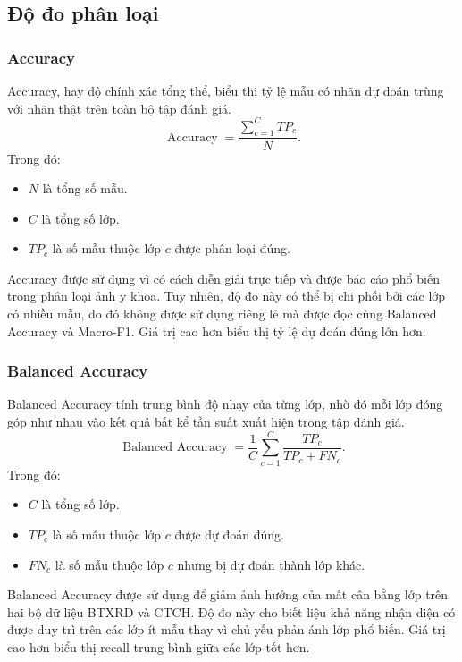 \subsection{Độ đo phân loại}
\subsubsection{Accuracy}
Accuracy, hay độ chính xác tổng thể, biểu thị tỷ lệ mẫu có nhãn dự đoán trùng với nhãn thật trên toàn bộ tập đánh giá.
\begin{equation}\operatorname{Accuracy}=\frac{\sum_{c=1}^{C} TP_c}{N}.\label{eq:ch4_accuracy}\end{equation}
Trong đó:
\begin{itemize}
    \item $N$ là tổng số mẫu.
    \item $C$ là tổng số lớp.
    \item $TP_c$ là số mẫu thuộc lớp $c$ được phân loại đúng.
\end{itemize}
Accuracy được sử dụng vì có cách diễn giải trực tiếp và được báo cáo phổ biến trong phân loại ảnh y khoa. Tuy nhiên, độ đo này có thể bị chi phối bởi các lớp có nhiều mẫu, do đó không được sử dụng riêng lẻ mà được đọc cùng Balanced Accuracy và Macro-F1. Giá trị cao hơn biểu thị tỷ lệ dự đoán đúng lớn hơn.
\subsubsection{Balanced Accuracy}
Balanced Accuracy \cite{Brodersen2010BalancedAcc} tính trung bình độ nhạy của từng lớp, nhờ đó mỗi lớp đóng góp như nhau vào kết quả bất kể tần suất xuất hiện trong tập đánh giá.
\begin{equation}\operatorname{Balanced\ Accuracy}=\frac{1}{C}\sum_{c=1}^{C}\frac{TP_c}{TP_c+FN_c}.\label{eq:ch4_balanced_accuracy}\end{equation}
Trong đó:
\begin{itemize}
    \item $C$ là tổng số lớp.
    \item $TP_c$ là số mẫu thuộc lớp $c$ được dự đoán đúng.
    \item $FN_c$ là số mẫu thuộc lớp $c$ nhưng bị dự đoán thành lớp khác.
\end{itemize}
Balanced Accuracy được sử dụng để giảm ảnh hưởng của mất cân bằng lớp trên hai bộ dữ liệu BTXRD và CTCH. Độ đo này cho biết liệu khả năng nhận diện có được duy trì trên các lớp ít mẫu thay vì chủ yếu phản ánh lớp phổ biến. Giá trị cao hơn biểu thị recall trung bình giữa các lớp tốt hơn.
